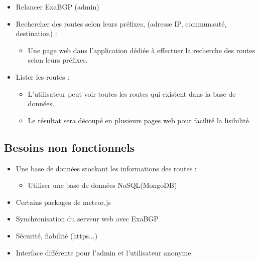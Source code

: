 \begin{itemize}
\item Relancer ExaBGP (admin)

\item Rechercher des routes selon leurs préfixes, (adresse IP, communauté, destination) :
	\begin{itemize}
		\item Une page web dans l'application dédiée à effectuer la recherche des routes selon leurs préfixes.
	\end{itemize}

\item Lister les routes :
	\begin{itemize}
		\item L'utilisateur peut voir toutes les routes qui existent dans la base de données.
        \item Le résultat sera découpé en plusieurs pages web pour facilité la lisibilité.
	\end{itemize}
\end{itemize}    

\subsection{Besoins non fonctionnels}

\begin{itemize}
\item Une base de données stockant les informations des routes : 
	\begin{itemize}
		\item Utiliser une base de données NoSQL(MongoDB)
	\end{itemize}
    
\item Certains packages de meteor.js
\item Synchronisation du serveur web avec ExaBGP
\item Sécurité, fiabilité (https...)
\item Interface différente pour l'admin et l'utilisateur anonyme
\end{itemize}
